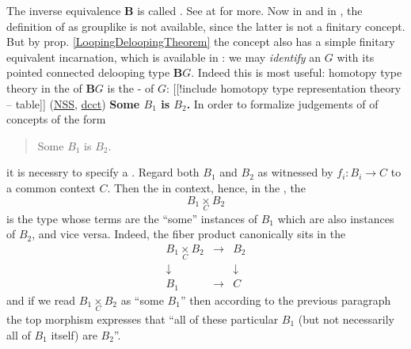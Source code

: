 \documentclass[12pt,titlepage]{article}
\newcommand{\itexarray}[1]{\begin{matrix}#1\end{matrix}}
\theoremstyle{plain}
\theoremstyle{definition}
\theoremstyle{remark}
\begin{document}
The inverse equivalence $\mathbf{B}$ is called . See at  for more.
Now in  and in , the definition of  as grouplike  is not available, since the latter is not a finitary concept. But by prop. \ref{LoopingDeloopingTheorem} the concept also has a simple finitary equivalent incarnation, which is available in : we may \emph{identify} an  $G$ with its pointed connected delooping type $\mathbf{B}G$.
Indeed this is most useful: homotopy type theory in the  of $\mathbf{B}G$ is the - of $G$:
[[!include homotopy type representation theory -- table]]
(\hyperlink{NSS}{NSS}, \hyperlink{dcct}{dcct})
\textbf{Some $B_1$ is $B_2$.}
In order to formalize judgements of  of concepts of the form
\begin{quote}%
Some $B_1$ is $B_2$.
\end{quote}
it is necessry to specify a . Regard both $B_1$ and $B_2$ as  witnessed by 
$f_i \colon B_i \longrightarrow C$
to a common context $C$. Then the  in context, hence, in the , the 
\begin{displaymath}
B_1 \underset{C}{\times} B_2
\end{displaymath}
is the type whose terms are the ``some'' instances of $B_1$ which are also instances of $B_2$, and vice versa. Indeed, the fiber product canonically sits in the  
\begin{displaymath}
\itexarray{
B_1 \underset{C}{\times} B_2
&\longrightarrow&
B_2
\\
\downarrow && \downarrow
\\
B_1 &\longrightarrow& C
}
\end{displaymath}
and if we read $B_1 \underset{C}{\times} B_2$ as ``some $B_1$'' then according to the previous paragraph the top morphism expresses that ``all of these particular $B_1$ (but not necessarily all of $B_1$ itself) are $B_2$''.
\end{document}
